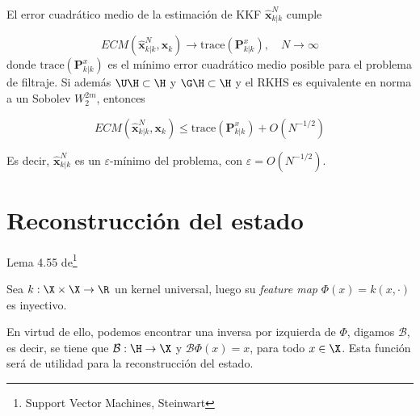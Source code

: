     \begin{cor}
	El error cuadrático  medio de la estimación de KKF $\hat{\mathbf{x}}^N_{k|k}$ cumple
	
	\begin{equation*}
		ECM(\hat{\mathbf{x}}^N_{k|k}, \mathbf{x}_k) \to \text{trace}(\mathbf{P}^x_{k|k}), \quad N \to \infty
	\end{equation*}
	donde $\text{trace}(\mathbf{P}^x_{k|k})$ es el mínimo error cuadrático medio posible para el problema de filtraje.
	Si además $\U \H \subset \H$ y $\G \H \subset \H$ y el RKHS es equivalente en norma a un Sobolev $W_2^{2m}$, entonces
	
	\begin{equation*}
		ECM(\hat{\mathbf{x}}^N_{k|k}, \mathbf{x}_k) \leq \text{trace}(\mathbf{P}^x_{k|k}) + O(N^{-1/2})
	\end{equation*}
\end{cor}
Es decir, $\hat{\mathbf{x}}^N_{k|k}$ es un $\varepsilon$-mínimo del problema, con $\varepsilon=O(N^{-1/2})$.

\section{Reconstrucción del estado} 

Lema 4.55 de\footnote{Support Vector Machines, Steinwart}
\begin{prop}
    Sea $k: \X \times \X \to \R$ un kernel universal, luego su \textit{feature map} $\Phi (x) = k (x, \cdot)$ es inyectivo.
\end{prop}

En virtud de ello, podemos encontrar una inversa por izquierda de $\Phi$, digamos $\mathcal{B}$, es decir, se tiene que $\mathcal{B} : \H \to \X$ y $\mathcal{B} \Phi (x) = x$, para todo $x \in \X$. Esta función será de utilidad para la reconstrucción del estado.



